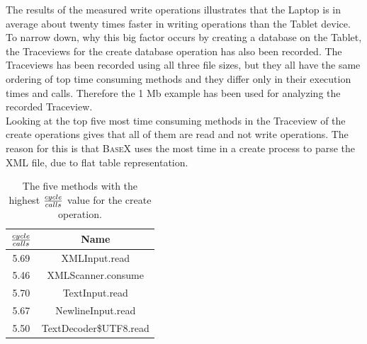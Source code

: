 The results of the measured write operations illustrates that the Laptop is in average about twenty times faster in writing operations than the Tablet device.
To narrow down, why this big factor occurs by creating a database on the Tablet, the Traceviews for the create database operation has also been recorded.
The Traceviews has been recorded using all three file sizes, but they all have the same ordering of top time consuming methods and they differ only in their execution times and calls.
Therefore the 1 Mb example has been used for analyzing the recorded Traceview.\\
Looking at the top five most time consuming methods in the Traceview of the create operations gives that all of them are read and not write operations.
The reason for this is that \textsc{BaseX} uses the most time in a create process to parse the XML file, due to flat table representation.~\cite{grun2010storing}

\begin{table}[htpb]
	\centering
	\begin{tabular}{|c|c|}
		\hline
		${cycle \over calls}$&Name\\
		\hline
		5.69&XMLInput.read\\
		\hline
		5.46&XMLScanner.consume\\
		\hline
		5.70&TextInput.read\\
		\hline
		5.67&NewlineInput.read\\
		\hline
		5.50&TextDecoder\$UTF8.read\\
		\hline
	\end{tabular}
	\caption{The five methods with the highest ${cycle \over calls}$ value for the create operation.}
	\label{tab:top-five-cycle-call-write}
\end{table}

